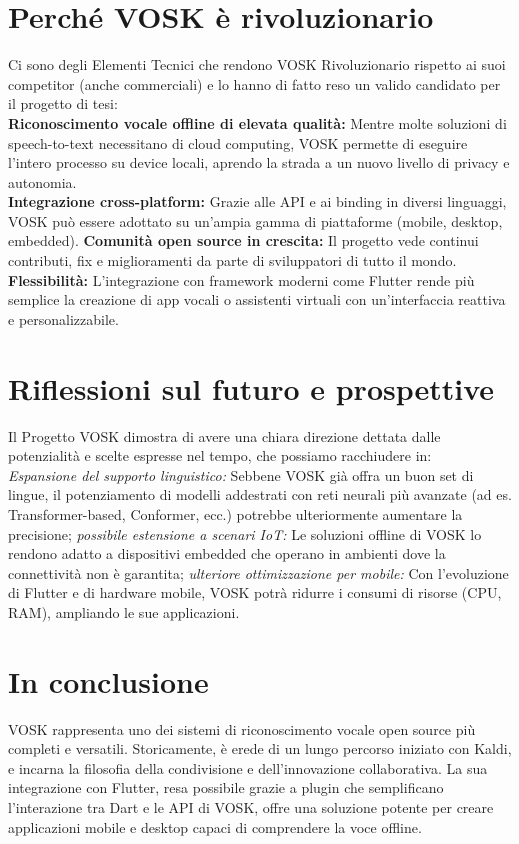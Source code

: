 \documentclass[14pt]{extbook}
\begin{document}
\section{Perché VOSK è rivoluzionario}
Ci sono degli Elementi Tecnici che rendono VOSK Rivoluzionario rispetto ai suoi competitor (anche commerciali) e lo hanno di fatto reso un valido candidato per il progetto di tesi:\\
\textbf{Riconoscimento vocale offline di elevata qualità:} Mentre molte soluzioni di speech-to-text necessitano di cloud computing, VOSK permette di eseguire l’intero processo su device locali, aprendo la strada a un nuovo livello di privacy e autonomia.\\
\textbf{Integrazione cross-platform:} Grazie alle API e ai binding in diversi linguaggi, VOSK può essere adottato su un’ampia gamma di piattaforme (mobile, desktop, embedded).
\textbf{Comunità open source in crescita:} Il progetto vede continui contributi, fix e miglioramenti da parte di sviluppatori di tutto il mondo.\\
\textbf{Flessibilità:} L’integrazione con framework moderni come Flutter rende più semplice la creazione di app vocali o assistenti virtuali con un’interfaccia reattiva e personalizzabile.\\

\section{Riflessioni sul futuro e prospettive}
Il Progetto VOSK dimostra di avere una chiara direzione dettata dalle potenzialità e scelte espresse nel tempo, che possiamo racchiudere in:\\
\textit{Espansione del supporto linguistico:} Sebbene VOSK già offra un buon set di lingue, il potenziamento di modelli addestrati con reti neurali più avanzate (ad es. Transformer-based, Conformer, ecc.) potrebbe ulteriormente aumentare la precisione;
\textit{possibile estensione a scenari IoT:} Le soluzioni offline di VOSK lo rendono adatto a dispositivi embedded che operano in ambienti dove la connettività non è garantita;
\textit{ulteriore ottimizzazione per mobile:} Con l’evoluzione di Flutter e di hardware mobile, VOSK potrà ridurre i consumi di risorse (CPU, RAM), ampliando le sue applicazioni.
\section{In conclusione}
VOSK rappresenta uno dei sistemi di riconoscimento vocale open source più completi e versatili. Storicamente, è erede di un lungo percorso iniziato con Kaldi, e incarna la filosofia della condivisione e dell’innovazione collaborativa. La sua integrazione con Flutter, resa possibile grazie a plugin che semplificano l’interazione tra Dart e le API di VOSK, offre una soluzione potente per creare applicazioni mobile e desktop capaci di comprendere la voce offline.\\
\end{document}
